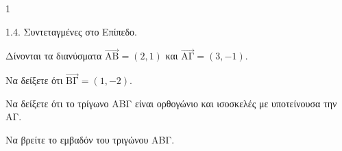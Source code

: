 \begin{ylh}{1}
    \item 1.4. Συντεταγμένες στο Επίπεδο.
\end{ylh}
Δίνονται τα διανύσματα $\vec{\text{AB}}=(2,1)$ και $\vec{\text{AΓ}}=(3,-1)$.
\begin{alist}
\item Να δείξετε ότι $\vec{\text{BΓ}}=(1,-2)$. 
\item Να δείξετε ότι το τρίγωνο ΑΒΓ είναι ορθογώνιο και ισοσκελές με υποτείνουσα την ΑΓ. 
\item Να βρείτε το εμβαδόν του τριγώνου ΑΒΓ. 
\end{alist}